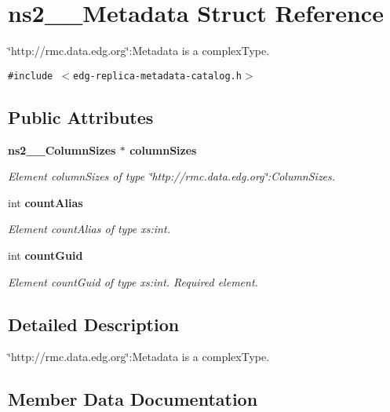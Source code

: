 \section{ns2\_\-\_\-Metadata Struct Reference}
\label{structns2____Metadata}
\char`\"{}http://rmc.data.edg.org\char`\"{}:Metadata is a complex\-Type.  


{\tt \#include $<$edg-replica-metadata-catalog.h$>$}

\subsection*{Public Attributes}
\begin{CompactItemize}
\item 
\bf{ns2\_\-\_\-Column\-Sizes} $\ast$ \bf{column\-Sizes}
\begin{CompactList}\small\item\em Element column\-Sizes of type \char`\"{}http://rmc.data.edg.org\char`\"{}:Column\-Sizes. \item\end{CompactList}\item 
int \bf{count\-Alias}
\begin{CompactList}\small\item\em Element count\-Alias of type xs:int. \item\end{CompactList}\item 
int \bf{count\-Guid}\label{structns2____Metadata_580196ca30d881f2a865b2c153586a3d}

\begin{CompactList}\small\item\em Element count\-Guid of type xs:int. Required element. \item\end{CompactList}\end{CompactItemize}


\subsection{Detailed Description}
\char`\"{}http://rmc.data.edg.org\char`\"{}:Metadata is a complex\-Type. 



\subsection{Member Data Documentation}
